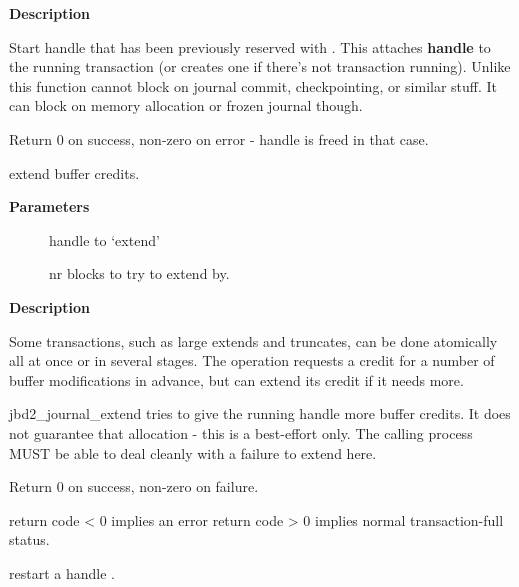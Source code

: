 \documentclass[a4paper,8pt,english]{sphinxmanual}
\begin{document}
\textbf{Description}

Start handle that has been previously reserved with .
This attaches \textbf{handle} to the running transaction (or creates one if there's
not transaction running). Unlike {\hyperref[filesystems/index:c.jbd2_journal_start]{\emph{}}} this function cannot
block on journal commit, checkpointing, or similar stuff. It can block on
memory allocation or frozen journal though.

Return 0 on success, non-zero on error - handle is freed in that case.

\begin{fulllineitems}
\label{filesystems/index:c.jbd2_journal_extend}
extend buffer credits.

\end{fulllineitems}


\textbf{Parameters}
\begin{description}
\item[{}] \leavevmode
handle to `extend'

\item[{}] \leavevmode
nr blocks to try to extend by.

\end{description}

\textbf{Description}

Some transactions, such as large extends and truncates, can be done
atomically all at once or in several stages.  The operation requests
a credit for a number of buffer modifications in advance, but can
extend its credit if it needs more.

jbd2\_journal\_extend tries to give the running handle more buffer credits.
It does not guarantee that allocation - this is a best-effort only.
The calling process MUST be able to deal cleanly with a failure to
extend here.

Return 0 on success, non-zero on failure.

return code \textless{} 0 implies an error
return code \textgreater{} 0 implies normal transaction-full status.

\begin{fulllineitems}
\label{filesystems/index:c.jbd2__journal_restart}
restart a handle .

\end{fulllineitems}
\end{document}
